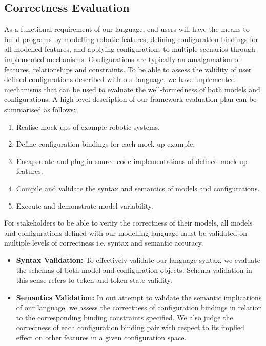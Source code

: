 \documentclass[conference]{IEEEtran}
\begin{document}
\subsection{Correctness Evaluation}
As a functional requirement of our language, end users will have the means to build programs by modelling robotic features, defining configuration bindings for all modelled features, and applying configurations to multiple scenarios through implemented mechanisms. Configurations are typically an amalgamation of features, relationships and constraints. To be able to assess the validity of user defined configurations described with our language, we have implemented mechanisms that can be used to evaluate the well-formedness of both models and configurations. A high level description of our framework evaluation plan can be summarised as follows:
\begin{enumerate}
  \item Realise mock-ups of example robotic systems.
  \item Define configuration bindings for each mock-up example.
  \item Encapsulate and plug in source code implementations of defined mock-up features.
  \item Compile and validate the syntax and semantics of models and configurations.
  \item Execute and demonstrate model variability.
\end{enumerate}
For stakeholders to be able to verify the correctness of their models, all models and configurations defined with our modelling language must be validated on multiple levels of correctness i.e. syntax and semantic accuracy. 
\begin{itemize}[label={}]
  \item \textbf{Syntax Validation: }To effectively validate our language syntax, we evaluate the schemas of both model and configuration objects. Schema validation in this sense refers to token and token state validity.
 
  \item \textbf{Semantics Validation: } In out attempt to validate the semantic implications of our language, we assess the correctness of configuration bindings in relation to the corresponding binding constraints specified. We also judge the correctness of each configuration binding pair with respect to its implied effect on other features in a given configuration space.
  
\end{itemize}
\end{document}
